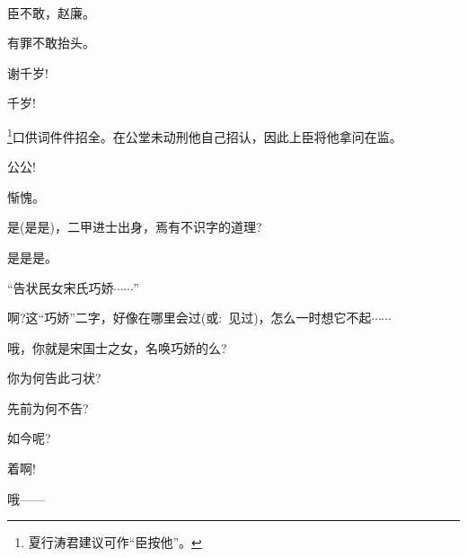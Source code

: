 \newpage\hspace{30pt}~

{%

\subsubsection{\large{}}

{\vspace{5pt}}

{臣不敢，赵廉。}\hspace{20pt}~

{有罪不敢抬头。}\hspace{20pt}~

{谢千岁!}\hspace{30pt}~


{千岁!}\hspace{40pt}~

\footnote{夏行涛君建议可作``臣按他''。}{口供词件件招全。在公堂未动刑他自己招认，因此上臣将他拿问在监。}

{公公!}\hspace{40pt}~

{惭愧。}\hspace{40pt}~

{是(是是)，二甲进士出身，焉有不识字的道理?}

{是是是。}\hspace{30pt}~

{``告状民女宋氏巧娇$\cdots{}\cdots{}$''}

{啊?这``巧娇''二字，好像在哪里会过({\akai 或}:~见过)，怎么一时想它不起$\cdots{}\cdots{}$}

{哦，你就是宋国士之女，名唤巧娇的么?}

{你为何告此刁状?}\hspace{20pt}~

{先前为何不告?}\hspace{20pt}~

{如今呢?}\hspace{30pt}~

{着啊!}\hspace{40pt}~

{哦------}\hspace{20pt}~

}
